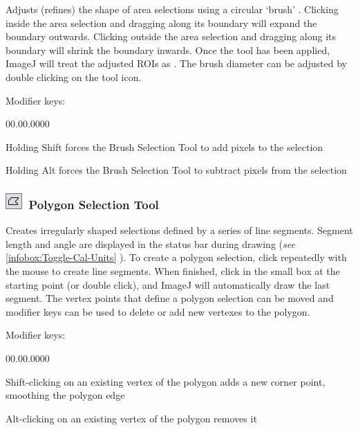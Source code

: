 \noindent Adjusts (refines) the shape of area selections using a circular
`brush' \cite{C-ROIbrush}. Clicking inside the area selection and
dragging along its boundary will expand the boundary outwards. Clicking
outside the area selection and dragging along its boundary will shrink
the boundary inwards. Once the tool has been applied, ImageJ will
treat the adjusted ROIs as . The
brush diameter can be adjusted by double clicking on the tool icon.

\noindent Modifier keys:
\begin{lyxlist}{00.00.0000}
\item [{\mykeystroke{Shift}}] \noindent Holding Shift forces the Brush
Selection Tool to add pixels to the selection
\item [{\mykeystroke{Alt}}] \noindent Holding Alt forces the Brush Selection
Tool to subtract pixels from the selection
\end{lyxlist}



\subsubsection[Polygon Selection Too\textsf{l}]{\noindent \textsf{\protect\includegraphics[bb=0bp 5bp 20bp 20bp,scale=0.6]{images/tools/Polygon}}~Polygon
Selection Tool\textsf{\label{sub:Polygon-Selection-Tool}}}

Creates irregularly shaped selections defined by a series of line
segments. Segment length and angle are displayed in the status bar
during drawing (\emph{see} \ref{infobox:Toggle-Cal-Units} ).
To create a polygon selection, click repeatedly with the mouse to
create line segments. When finished, click in the small box at the
starting point (or double click), and ImageJ will automatically draw
the last segment. The vertex points that define a polygon selection
can be moved and modifier keys can be used to delete or add new vertexes
to the polygon. 

Modifier keys:
\begin{lyxlist}{00.00.0000}
\item [{\mykeystroke{Shift}}] \noindent Shift-clicking on an existing
vertex of the polygon adds a new corner point, smoothing the polygon
edge
\item [{\mykeystroke{Alt}}] \noindent Alt-clicking on an existing vertex
of the polygon removes it
\end{lyxlist}

